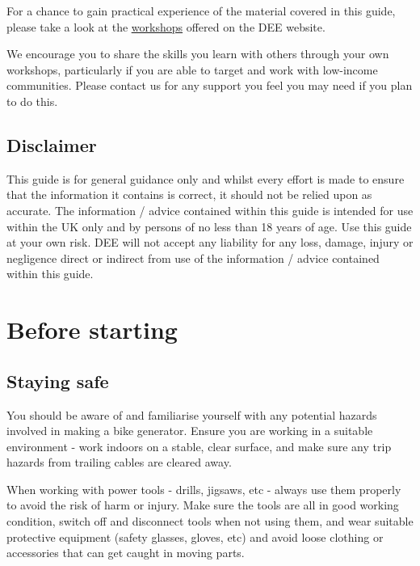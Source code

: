 \documentclass{article}
\theoremstyle{definition}
\theoremstyle{definition}
\theoremstyle{remark}
\begin{document}
    For a chance to gain practical experience of the material covered in this guide, please take a look at the \href{https://www.demandenergyequality.org/our-workshops/}{\underline{workshops}} offered on the DEE website.

    We encourage you to share the skills you learn with others through your own workshops, particularly if you are able to target and work with low-income communities. Please contact us for any support you feel you may need if you plan to do this.


  \subsection{Disclaimer} %
  \label{sub:disclaimer}

    This guide is for general guidance only and whilst every effort is made to ensure that the information it contains is correct, it should not be relied upon as accurate. The information / advice contained within this guide is intended for use within the UK only and by persons of no less than 18 years of age. Use this guide at your own risk. DEE will not accept any liability for any loss, damage, injury or negligence direct or indirect from use of the information / advice contained within this guide.


  \newpage  


\section{Before starting} %
\label{sec:before_starting}

  \subsection{Staying safe} %
  \label{sub:staying_safe}

    You should be aware of and familiarise yourself with any potential hazards involved in making a bike generator. Ensure you are working in a suitable environment - work indoors on a stable, clear surface, and make sure any trip hazards from trailing cables are cleared away. 

    When working with power tools - drills, jigsaws, etc - always use them properly to avoid the risk of harm or injury. Make sure the tools are all in good working condition, switch off and disconnect tools when not using them, and wear suitable protective equipment (safety glasses, gloves, etc) and avoid loose clothing or accessories that can get caught in moving parts.
\end{document}
